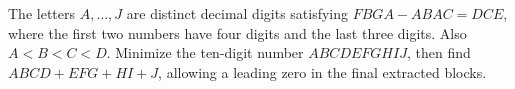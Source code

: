The letters $A,\ldots,J$ are distinct decimal digits satisfying $FBGA-ABAC=DCE$, where the first two numbers have four digits and the last three digits. Also $A<B<C<D$. Minimize the ten-digit number $ABCDEFGHIJ$, then find $ABCD+EFG+HI+J$, allowing a leading zero in the final extracted blocks.
